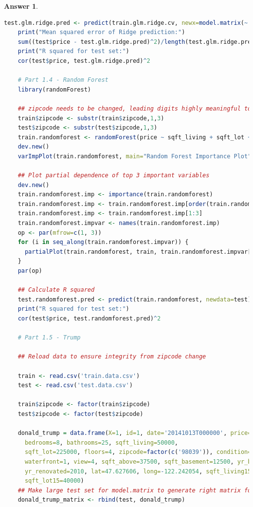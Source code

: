 \documentclass[12pt]{article}
\theoremstyle{colon}
\newtheorem*{answer}{Answer}
\begin{document}
\begin{answer}
\begin{lstlisting}[language=R, basicstyle=\scriptsize, breaklines=true]
    test.glm.ridge.pred <- predict(train.glm.ridge.cv, newx=model.matrix(~ 0 + bedrooms + bathrooms + sqft_living + sqft_lot + floors + waterfront + view + condition + grade + sqft_above + sqft_basement + yr_built + yr_renovated + zipcode + lat + long + sqft_living15 + sqft_lot15, data=test), s="lambda.min")
    print("Mean squared error of Ridge prediction:")
    sum((test$price - test.glm.ridge.pred)^2)/length(test.glm.ridge.pred)
    print("R squared for test set:")
    cor(test$price, test.glm.ridge.pred)^2

    # Part 1.4 - Random Forest
    library(randomForest)

    ## zipcode needs to be changed, leading digits highly meaningful to specific region of US
    train$zipcode <- substr(train$zipcode,1,3)
    test$zipcode <- substr(test$zipcode,1,3)
    train.randomforest <- randomForest(price ~ sqft_living + sqft_lot + bedrooms + bathrooms + floors + zipcode, data=train)
    dev.new()
    varImpPlot(train.randomforest, main="Random Forest Importance Plot")

    ## Plot partial dependence of top 3 important variables
    dev.new()
    train.randomforest.imp <- importance(train.randomforest)
    train.randomforest.imp <- train.randomforest.imp[order(train.randomforest.imp, decreasing=TRUE),]
    train.randomforest.imp <- train.randomforest.imp[1:3]
    train.randomforest.impvar <- names(train.randomforest.imp)
    op <- par(mfrow=c(1, 3))
    for (i in seq_along(train.randomforest.impvar)) {
      partialPlot(train.randomforest, train, train.randomforest.impvar[i], xlab=train.randomforest.impvar[i], main=paste("Partial Dependence on", train.randomforest.impvar[i]))
    }
    par(op)

    ## Calculate R squared
    test.randomforest.pred <- predict(train.randomforest, newdata=test)
    print("R squared for test set:")
    cor(test$price, test.randomforest.pred)^2

    # Part 1.5 - Trump

    ## Reload data to ensure integrity from zipcode change

    train <- read.csv('train.data.csv')
    test <- read.csv('test.data.csv')

    train$zipcode <- factor(train$zipcode)
    test$zipcode <- factor(test$zipcode)

    donald_trump = data.frame(X=1, id=1, date='20141013T000000', price=14000000,
      bedrooms=8, bathrooms=25, sqft_living=50000,
      sqft_lot=225000, floors=4, zipcode=factor(c('98039')), condition=10, grade=10,
      waterfront=1, view=4, sqft_above=37500, sqft_basement=12500, yr_built=1994,
      yr_renovated=2010, lat=47.627606, long=-122.242054, sqft_living15=5000,
      sqft_lot15=40000)
    ## Make large test set for model.matrix to generate right matrix for Trump
    donald_trump_matrix <- rbind(test, donald_trump)


\end{lstlisting}
\end{answer}
\end{document}

